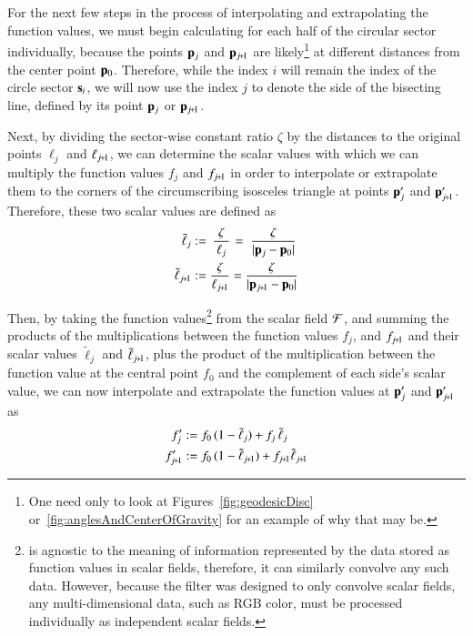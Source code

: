 For the next few steps in the process of interpolating and extrapolating the function values, we must begin calculating for each half of the circular sector individually, because the points $\mathbf{p}_j$ and $\bp_{\sjpo}$ are likely\footnote{One need only to look at Figures~\ref{fig:geodesicDisc} or~\ref{fig:anglesAndCenterOfGravity} for an example of why that may be.} at different distances from the center point $\mathbf{p}_0$. Therefore, while the index $i$ will remain the index of the circle sector $\mathbf{s}_i$, we will now use the index $j$ to denote the side of the bisecting line, defined by its point $\mathbf{p}_j$ or $\bp_{\sjpo}$. 

Next, by dividing the sector-wise constant ratio $\zeta$ by the distances to the original points $\ell_j$ and $\ell_{\sjpo}$, we can determine the scalar values with which we can multiply the function values $f_j$ and $f_{\sjpo}$ in order to interpolate or extrapolate them to the corners of the circumscribing isosceles triangle at points $\mathbf{p}'_j$ and $\bp'_{\sjpo}$. Therefore, these two scalar values are defined as
%
\begin{align}
	\tilde{\ell}_j & := \kern2pt\frac{\zeta}{\kern2pt\ell_j\kern2pt}\kern1pt = \kern3pt\frac{\zeta}{|\bp_j - \bp_0|}
	\label{eq:distanceIForInterpolation}\\
	\tilde{\ell}_{\sjpo} & := \frac{\zeta}{\ell_{\sjpo}} = \frac{\zeta}{|\bp_{\sjpo} - \bp_0|}
	\label{eq:distanceIp1ForInterpolation}
\end{align}%
%

Then, by taking the function values\footnote{ is agnostic to the meaning of information represented by the data stored as function values in scalar fields, therefore, it can similarly convolve any such data. However, because the filter was designed to only convolve scalar fields, any multi-dimensional data, such as RGB color, must be processed individually as independent scalar fields.} from the scalar field $\mathcal{F}$, and summing the products of the multiplications between the function values $f_j$, and $f_{\sjpo}$ and their scalar values $\tilde{\ell}_j$ and $\tilde{\ell}_{\sjpo}$, plus the product of the multiplication between the function value at the central point $f_0$ and the complement of each side's scalar value, we can now interpolate and extrapolate the function values at $\mathbf{p}'_j$ and $\bp'_{\sjpo}$ as
%
\begin{align}
	f'_j & := f_0\,(1 - \tilde{\ell}_j) + f_j\,\tilde{\ell}_j
	\label{eq:interpolatedFi} \\
	f'_{\sjpo} & := f_0\,(1 - \tilde{\ell}_{\sjpo}) + f_{\sjpo}\tilde{\ell}_{\sjpo}
	\label{eq:interpolatedFip1}
\end{align}%
%

